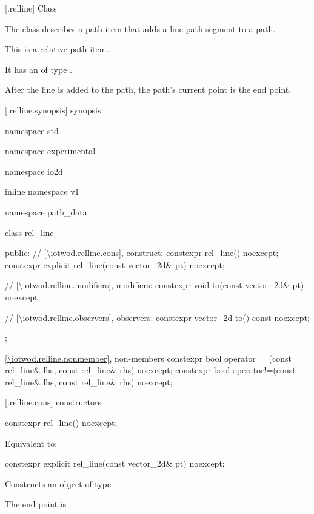  [\iotwod.relline] {Class }%

\pnum
{}%
The class  describes a path item that adds a line path segment to a path.

\pnum
This is a relative path item.

\pnum
It has an  of type .

\pnum
After the line is added to the path, the path's current point is the end point.

 [\iotwod.relline.synopsis] { synopsis}

\begin{codeblock}
namespace std { namespace experimental { namespace io2d { inline namespace v1 {
  namespace path_data {
    class rel_line {
    public:
      // \ref{\iotwod.relline.cons}, construct:
      constexpr rel_line() noexcept;
      constexpr explicit rel_line(const vector_2d& pt) noexcept;

      // \ref{\iotwod.relline.modifiers}, modifiers:
      constexpr void to(const vector_2d& pt) noexcept;

      // \ref{\iotwod.relline.observers}, observers:
      constexpr vector_2d to() const noexcept;
    };
    
    \ref{\iotwod.relline.nonmember}, non-members
    constexpr bool operator==(const rel_line& lhs, const rel_line& rhs) 
      noexcept;
    constexpr bool operator!=(const rel_line& lhs, const rel_line& rhs) 
      noexcept;
  }
} } } }
\end{codeblock}

 [\iotwod.relline.cons] { constructors}%

%
\begin{itemdecl}
constexpr rel_line() noexcept;
\end{itemdecl}
\begin{itemdescr}
\pnum
\effects
Equivalent to: 
\end{itemdescr}

%
\begin{itemdecl}
constexpr explicit rel_line(const vector_2d& pt) noexcept;
\end{itemdecl}
\begin{itemdescr}
\pnum
\effects
Constructs an object of type .

\pnum
The end point is .
\end{itemdescr}

